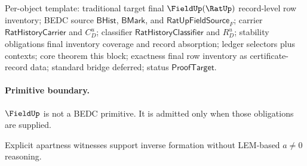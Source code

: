 Per-object template: traditional target final $\FieldUp(\RatUp)$ record-level
row inventory; BEDC source $\mathsf{BHist}$, $\mathsf{BMark}$, and
$\mathsf{RatUpFieldSource}_F$; carrier $\mathsf{RatHistoryCarrier}$ and
$C_D^u$; classifier $\mathsf{RatHistoryClassifier}$ and $R_D^u$; stability
obligations final inventory coverage and record absorption; ledger selectors
plus contexts; core theorem this block; exactness final row inventory as
certificate-record data; standard bridge deferred; status
$\mathsf{ProofTarget}$.

\paragraph{Primitive boundary.}
$\FieldUp$ is not a BEDC primitive. It is admitted only when those obligations are supplied.

\begin{remark}
\label{rem:field-zero-axiom-note}
Explicit apartness witnesses support inverse formation without LEM-based
$a\ne0$ reasoning.
\end{remark}

